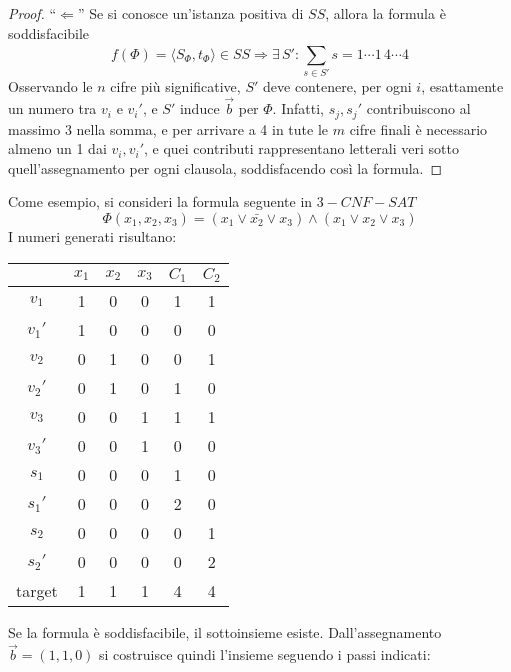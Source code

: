 \begin{proof}
    ``$\Leftarrow$''
    Se si conosce un'istanza positiva di $SS$, allora la formula è soddisfacibile 
    \begin{equation*}
        f \left( \Phi \right) = 
        \langle
        S_{\Phi}, t_{\Phi}
        \rangle \in SS
        \Rightarrow
        \exists \, S' : \sum_{s \in S'}^{} s = 1 \cdots 1 \, 4 \cdots 4
    \end{equation*}
    Osservando le $n$ cifre più significative, $S'$ deve contenere, per ogni $i$, esattamente un numero tra $v_i$ e $v_i'$, e $S'$ induce $\vec{b}$ per $\Phi$.
    Infatti, $s_j, s_j'$ contribuiscono al massimo 3 nella somma, e per arrivare a 4 in tute le $m$ cifre finali è necessario almeno un 1 dai $v_i, v_i'$, e quei contributi rappresentano letterali veri sotto quell'assegnamento per ogni clausola, soddisfacendo così la formula.
\end{proof}
Come esempio, si consideri la formula seguente in $3-CNF-SAT$
\begin{equation*}
    \Phi \left( x_1, x_2, x_3 \right) = 
    \left( x_1 \vee \bar{x_2} \vee x_3 \right)
    \wedge
    \left( x_1 \vee x_2 \vee x_3 \right)
\end{equation*}
I numeri generati risultano:
\begin{center}
    \begin{tabular}[h]{c|ccc|cc}
               & $x_1$ & $x_2$ & $x_3$ & $C_1$ & $C_2$ \\
        \hline
        $v_1$  & 1 & 0 & 0 & 1 & 1 \\
        $v_1'$ & 1 & 0 & 0 & 0 & 0 \\
        $v_2$  & 0 & 1 & 0 & 0 & 1 \\
        $v_2'$ & 0 & 1 & 0 & 1 & 0 \\
        $v_3$  & 0 & 0 & 1 & 1 & 1 \\
        $v_3'$ & 0 & 0 & 1 & 0 & 0 \\
        \hline
        $s_1$  & 0 & 0 & 0 & 1 & 0 \\
        $s_1'$ & 0 & 0 & 0 & 2 & 0 \\
        $s_2$  & 0 & 0 & 0 & 0 & 1 \\
        $s_2'$ & 0 & 0 & 0 & 0 & 2 \\
        \hline
        target & 1 & 1 & 1 & 4 & 4 \\
    \end{tabular}
\end{center}
Se la formula è soddisfacibile, il sottoinsieme esiste. Dall'assegnamento $\vec{b} = (1,1,0)$ si costruisce quindi l'insieme seguendo i passi indicati:
